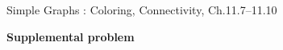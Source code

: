 \documentclass[handout]{mcs}
\begin{document}

\begin{staffnotes}
Simple Graphs : Coloring, Connectivity, Ch.11.7--11.10
\end{staffnotes}



\begin{center}
\textbf{\large Supplemental problem}
\end{center}


\end{document}
